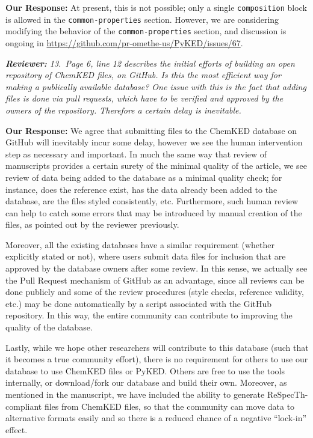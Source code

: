 \documentclass[a4paper,10pt]{elsarticle}
\newenvironment{reviewer}{\vspace{0.5\baselineskip}\begingroup\itshape\textbf{Reviewer:}}{\endgroup}
\newenvironment{response}{\textbf{Our Response:}}{\vspace{0.5\baselineskip}}
\begin{document}
\begin{response}
    At present, this is not possible; only a single \verb|composition| block is allowed in the
    \verb|common-properties| section. However, we are considering modifying the behavior of the
    \verb|common-properties| section, and discussion is ongoing in
    \url{https://github.com/pr-omethe-us/PyKED/issues/67}.
\end{response}

\begin{reviewer}
    13.~Page 6, line 12 describes the initial efforts of building an open repository of ChemKED
    files, on GitHub. Is this the most efficient way for making a publically available database? One
    issue with this is the fact that adding files is done via pull requests, which have to be
    verified and approved by the owners of the repository. Therefore a certain delay is inevitable.
\end{reviewer}

\begin{response}
    We agree that submitting files to the ChemKED database on GitHub will inevitably incur some
    delay, however we see the human intervention step as necessary and important. In much the same
    way that review of manuscripts provides a certain surety of the minimal quality of the article,
    we see review of data being added to the database as a minimal quality check; for instance, does
    the reference exist, has the data already been added to the database, are the files styled
    consistently, etc. Furthermore, such human review can help to catch some errors that may be
    introduced by manual creation of the files, as pointed out by the reviewer previously.

    Moreover, all the existing databases have a similar requirement (whether explicitly stated or
    not), where users submit data files for inclusion that are approved by the database owners after
    some review. In this sense, we actually see the Pull Request mechanism of GitHub as an
    advantage, since all reviews can be done publicly and some of the review procedures (style
    checks, reference validity, etc.) may be done automatically by a script associated with the
    GitHub repository. In this way, the entire community can contribute to improving the quality of
    the database.

    Lastly, while we hope other researchers will contribute to this database (such that it becomes a
    true community effort), there is no requirement for others to use our database to use ChemKED
    files or PyKED. Others are free to use the tools internally, or download\slash fork our database
    and build their own. Moreover, as mentioned in the manuscript, we have included the ability to
    generate ReSpecTh-compliant files from ChemKED files, so that the community can move data to
    alternative formats easily and so there is a reduced chance of a negative ``lock-in'' effect.
\end{response}
\end{document}
